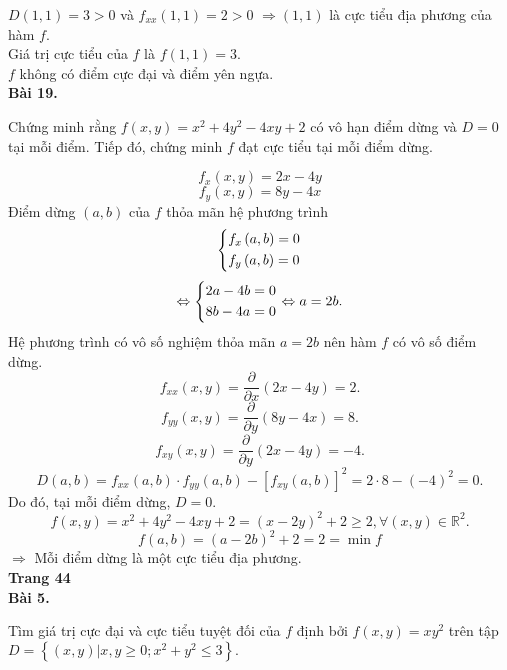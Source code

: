 \documentclass[12pt,a4paper]{article}
\begin{document}
\(D\left( {1,1} \right) = 3 > 0\) và \({f_{xx}}\left( {1,1} \right) = 2 > 0\) \( \Rightarrow \left( {1,1} \right)\) là cực tiểu địa phương của hàm \(f.\)\\ 
Giá trị cực tiểu của \(f\) là \(f\left( {1,1} \right) = 3.\)\\
\(f\) không có điểm cực đại và điểm yên ngựa.\\
\textbf{Bài 19.}
\begin{mybox}
Chứng minh rằng \(f\left( {x,y} \right) = {x^2} + 4{y^2} - 4xy + 2\) có vô hạn điểm dừng và \(D = 0\) tại mỗi điểm. Tiếp đó, chứng minh \(f\) đạt cực tiểu tại mỗi điểm dừng.
\end{mybox}
\[{f_x}\left( {x,y} \right) = 2x - 4y\]
\[{f_y}\left( {x,y} \right) = 8y - 4x\]
Điểm dừng \(\left( {a,b} \right)\) của \(f\) thỏa mãn hệ phương trình
\[\left\{ \begin{gathered}
  {f_x}\left( {a,b} \right) = 0 \hfill \\
  {f_y}\left( {a,b} \right) = 0 \hfill \\ 
\end{gathered}  \right.\]
\[ \Leftrightarrow \left\{ \begin{gathered}
  2a - 4b = 0 \hfill \\
  8b - 4a = 0 \hfill \\ 
\end{gathered}  \right. \Leftrightarrow a = 2b.\]
Hệ phương trình có vô số nghiệm thỏa mãn \(a = 2b\) nên hàm \(f\) có vô số điểm dừng.
\[{f_{xx}}\left( {x,y} \right) = \frac{\partial }{{\partial x}}\left( {2x - 4y} \right) = 2.\]
\[{f_{yy}}\left( {x,y} \right) = \frac{\partial }{{\partial y}}\left( {8y - 4x} \right) = 8.\]
\[{f_{xy}}\left( {x,y} \right) = \frac{\partial }{{\partial y}}\left( {2x - 4y} \right) =  - 4.\]
\[D\left( {a,b} \right) = {f_{xx}}\left( {a,b} \right) \cdot {f_{yy}}\left( {a,b} \right) - {\left[ {{f_{xy}}\left( {a,b} \right)} \right]^2} = 2 \cdot 8 - {\left( { - 4} \right)^2} = 0.\]
Do đó, tại mỗi điểm dừng, \(D = 0.\)\\
\[f\left( {x,y} \right) = {x^2} + 4{y^2} - 4xy + 2 = {\left( {x - 2y} \right)^2} + 2 \geqslant 2,\forall \left( {x,y} \right) \in {\mathbb{R}^2}.\]
\[f\left( {a,b} \right) = {\left( {a - 2b} \right)^2} + 2 = 2 = \min f\]
\( \Rightarrow \) Mỗi điểm dừng là một cực tiểu địa phương.\\
\textbf{Trang 44}\\
\textbf{Bài 5.} 
\begin{mybox}
Tìm giá trị cực đại và cực tiểu tuyệt đối của \(f\) định bởi \(f\left( {x,y} \right) = x{y^2}\) trên tập \(D = \left\{ {\left. {\left( {x,y} \right)} \right|x,y \geqslant 0;{x^2} + {y^2} \leqslant 3} \right\}.\)
\end{mybox}
\end{document}
